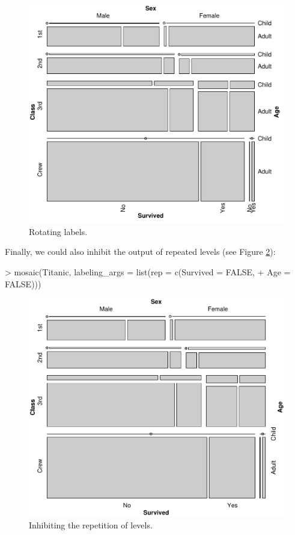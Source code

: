 \documentclass[a4paper]{article}
\begin{document}
\begin{figure}[p]
\begin{center}
\includegraphics{labeling-rotatefig}
\caption{Rotating labels.}
\label{fig:rotating}
\end{center}
\end{figure}

\noindent Finally, we could also inhibit the output of repeated levels 
(see Figure \ref{fig:repeat}):

\begin{Schunk}
\begin{Sinput}
> mosaic(Titanic, labeling_args = list(rep = c(Survived = FALSE, 
+     Age = FALSE)))
\end{Sinput}
\end{Schunk}

\begin{figure}[p]
\begin{center}
\includegraphics{labeling-repeatfig}
\caption{Inhibiting the repetition of levels.}
\label{fig:repeat}
\end{center}
\end{figure}
\end{document}
